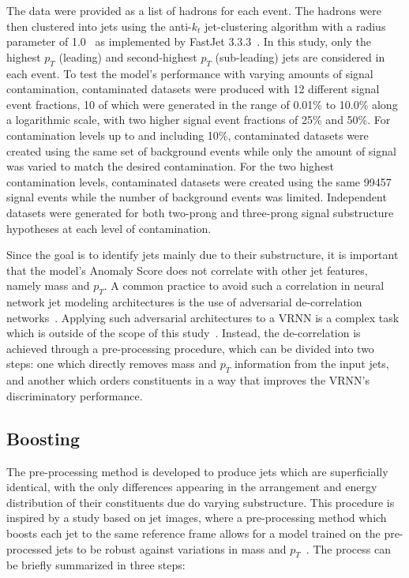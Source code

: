 \documentclass[11pt, a4paper]{article}
\begin{document}
The data were provided as a list of hadrons for each event. The hadrons were then clustered into jets using the anti-$k_{t}$ jet-clustering algorithm with a radius parameter of 1.0~\cite{Cacciari_2008} as implemented by  {\sc FastJet 3.3.3}~\cite{fastjet}. In this study, only the highest $p_{T}$ (leading) and second-highest $p_{T}$ (sub-leading) jets are considered in each event. To test the model's performance with varying amounts of signal contamination, contaminated datasets were produced with 12 different signal event fractions, 10 of which were generated in the range of 0.01\% to 10.0\% along a logarithmic scale, with two higher signal event fractions of 25\% and 50\%. For contamination levels up to and including 10\%, contaminated datasets were created using the same set of background events while only the amount of signal was varied to match the desired contamination. For the two highest contamination levels, contaminated datasets were created using the same 99457 signal events while the number of background events was limited. 
Independent datasets were generated for both two-prong and three-prong signal substructure hypotheses at each level of contamination.

Since the goal is to identify jets mainly due to their substructure, it is important that the model's Anomaly Score does not correlate with other jet features, namely mass and $p_{T}$. A common practice to avoid such a correlation in neural network jet modeling architectures is the use of adversarial de-correlation networks~\cite{louppe2017learning}. Applying such adversarial architectures to a VRNN is a complex task which is outside of the scope of this study~\cite{Purushotham2017VariationalRA}. Instead, the de-correlation is achieved through a pre-processing procedure, which can be divided into two steps: one which directly removes mass and $p_{T}$ information from the input jets, and another which orders constituents in a way that improves the VRNN's discriminatory performance.

\subsection{Boosting}

The pre-processing method is developed to produce jets which are superficially identical, with the only differences appearing in the arrangement and energy distribution of their constituents due do varying substructure. This procedure is inspired by a study based on jet images, where a pre-processing method which boosts each jet to the same reference frame allows for a model trained on the pre-processed jets to be robust against variations in mass and $p_{T}$~\cite{roy2020robust}. The process can be briefly summarized in three steps:
\end{document}
